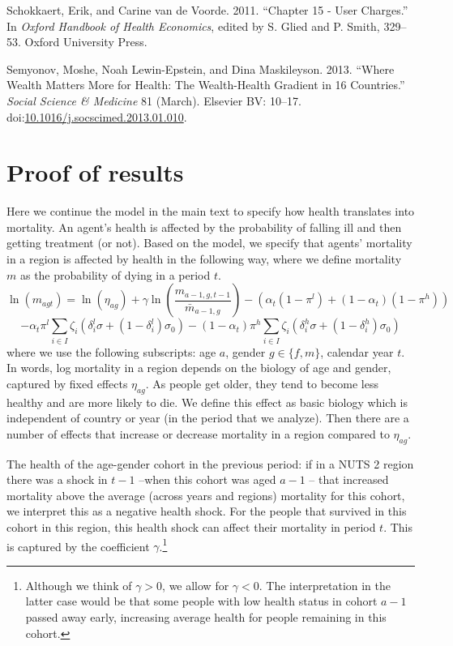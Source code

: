 \documentclass[a4paper,12pt]{article}
\begin{document}
\hypertarget{citeproc_bib_item_24}{Schokkaert, Erik, and Carine van de Voorde. 2011. “Chapter 15 - User Charges.” In \textit{Oxford Handbook of Health Economics}, edited by S. Glied and P. Smith, 329–53. Oxford University Press.}

\hypertarget{citeproc_bib_item_25}{Semyonov, Moshe, Noah Lewin-Epstein, and Dina Maskileyson. 2013. “Where Wealth Matters More for Health: The Wealth-Health Gradient in 16 Countries.” \textit{Social Science \& Medicine} 81 (March). Elsevier BV: 10–17. doi:\href{https://doi.org/10.1016/j.socscimed.2013.01.010}{10.1016/j.socscimed.2013.01.010}.}\bigskip



\newpage
\appendix

\section{Proof of results}
\label{sec:org008a700}
\label{sec:proofs_appendix}


Here we continue the model in the main text to specify how health translates into mortality. An agent's health is affected by the probability of falling ill and then getting treatment (or not). Based on the model, we specify that agents' mortality in a region is affected by health in the following way, where we define mortality \(m\) as the probability of dying in a period \(t\).
\begin{equation}
\label{eq:health}
\ln(m_{agt}) = \ln({\eta}_{ag}) + \gamma \ln \left( \frac{m_{a-1,g,t-1}}{\bar m_{a-1,g}}\right) - (\alpha_t (1-\pi^l) + (1-\alpha_t) (1-\pi^{h}))
\end{equation}
\begin{equation*}
 - \alpha_{t} \pi^l \sum_{i \in I} \zeta_i (\delta_i^l \sigma + (1-\delta_i^l)\sigma_0) - (1-\alpha_{t}) \pi^h \sum_{i \in I} \zeta_i (\delta_i^h \sigma + (1-\delta_i^h) \sigma_0)
\end{equation*}
where we use the following subscripts: age \(a\), gender \(g \in \{f,m\}\), calendar year \(t\). In words, log mortality in a region depends on the biology of age and gender, captured by fixed effects \(\eta_{ag}\). As people get older, they tend to become less healthy and are more likely to die. We define this effect as basic biology which is independent of country or year (in the period that we analyze). Then there are a number of effects that increase or decrease mortality in a region compared to \(\eta_{ag}\).

The health of the age-gender cohort in the previous period: if in a NUTS 2 region there was a shock in \(t-1\) --when this cohort was aged \(a-1\) -- that increased mortality above the average (across years and regions) mortality for this cohort, we interpret this as a negative health shock. For the people that survived in this cohort in this region, this health shock can affect their mortality in period \(t\). This is captured by the coefficient \(\gamma\).\footnote{Although we think of \(\gamma>0\), we allow for \(\gamma<0\). The interpretation in the latter case would be that some people with low health status in cohort \(a-1\) passed away early, increasing average health for people remaining in this cohort.}
\end{document}
